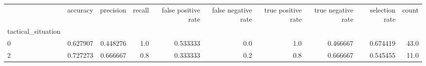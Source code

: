 \begin{tabular}{lrrrrrrrrr}
\toprule
{} &  accuracy &  precision &  recall &  false positive rate &  false negative rate &  true positive rate &  true negative rate &  selection rate &  count \\
tactical\_situation &           &            &         &                      &                      &                     &                     &                 &        \\
\midrule
0                  &  0.627907 &   0.448276 &     1.0 &             0.533333 &                  0.0 &                 1.0 &            0.466667 &        0.674419 &   43.0 \\
2                  &  0.727273 &   0.666667 &     0.8 &             0.333333 &                  0.2 &                 0.8 &            0.666667 &        0.545455 &   11.0 \\
\bottomrule
\end{tabular}
